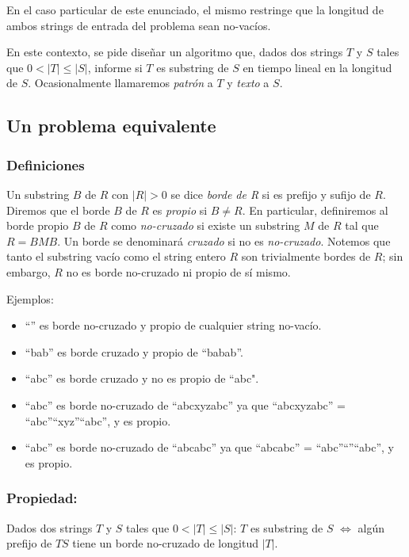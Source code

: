 En el caso particular de este enunciado, el mismo restringe que la longitud de ambos strings de entrada del problema sean no-vacíos.

En este contexto, se pide diseñar un algoritmo que, dados dos strings $T$ y $S$ tales que $0 < |T| \leq |S|$, informe si $T$ es substring de $S$ en tiempo lineal en la longitud de $S$. Ocasionalmente llamaremos \textit{patrón} a $T$ y \textit{texto} a $S$.

\subsection{Un problema equivalente}

\subsubsection{Definiciones}

Un substring $B$ de $R$ con $|R| > 0$ se dice \textit{borde de R} si es prefijo y sufijo de $R$. Diremos que el borde $B$ de $R$ es \textit{propio} si $B \neq R$. En particular, definiremos al borde propio $B$ de $R$ como \textit{no-cruzado} si existe un substring $M$ de $R$ tal que $R = BMB$. Un borde se denominará \textit{cruzado} si no es \textit{no-cruzado}. Notemos que tanto el substring vacío como el string entero $R$ son trivialmente bordes de $R$; sin embargo, $R$ no es borde no-cruzado ni propio de sí mismo.

Ejemplos:
\begin{itemize}
\setlength\itemsep{0em}
\item ``'' es borde no-cruzado y propio de cualquier string no-vacío.
\item ``bab'' es borde cruzado y propio de ``babab''.
\item ``abc'' es borde cruzado y no es propio de ``abc".
\item ``abc'' es borde no-cruzado de ``abcxyzabc'' ya que ``abcxyzabc'' = ``abc''``xyz''``abc'', y es propio.
\item ``abc'' es borde no-cruzado de ``abcabc'' ya que ``abcabc'' = ``abc''``''``abc'', y es propio.
\end{itemize}

\subsubsection{Propiedad:} Dados dos strings $T$ y $S$ tales que $0 < |T| \leq |S|$:
$T$ es substring de $S$ $\iff$ algún prefijo de $TS$ tiene un borde no-cruzado de longitud $|T|$.

